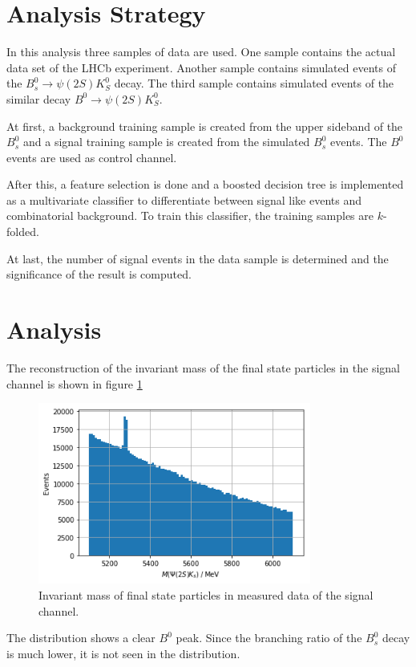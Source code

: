 \section{Analysis Strategy}
\label{sec:Analysis-Strategy}

In this analysis three samples of data are used. One sample contains the actual data set of the LHCb experiment. Another sample contains simulated events of the $B^0_s \rightarrow \psi(2S)K^0_S$ decay. The third sample contains simulated events of the similar decay $B^0 \rightarrow \psi(2S)K^0_S$.

At first, a background training sample is created from the upper sideband of the $B^0_s$ and a signal training sample is created from the simulated $B^0_s$ events.
The $B^0$ events are used as control channel.

After this, a feature selection is done and a boosted decision tree is implemented as a multivariate classifier to differentiate between signal like events and combinatorial background. To train this classifier, the training samples are $k$-folded.

At last, the number of signal events in the data sample is determined and the significance of the result is computed.


\section{Analysis}
The reconstruction of the invariant mass of the final state particles in the signal channel is shown in figure \ref{fig:BM_Data} \begin{figure}[!htb]
  \centering
  \includegraphics[width=0.8\textwidth]{plots/BM_Data.png}
  \caption{Invariant mass of final state particles in measured data of the signal channel.}
  \label{fig:BM_Data}
\end{figure}
The distribution shows a clear $B^0$ peak.
Since the branching ratio of the $B^0_s$ decay is much lower, it is not seen in the distribution.


